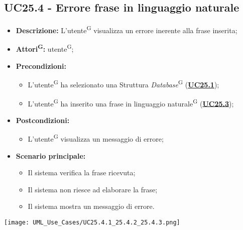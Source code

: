 \subsection{UC25.4 - Errore frase in linguaggio naturale}
\label{sec:UC25.4}
\begin{itemize}
	\item \textbf{Descrizione:} L’utente\textsuperscript{G} visualizza un errore inerente alla frase inserita;
	\item \textbf{Attori\textsuperscript{G}:} utente\textsuperscript{G};
	\item \textbf{Precondizioni:} 
	\begin{itemize}
		\item L’utente\textsuperscript{G} ha selezionato una Struttura \textit{Database}\textsuperscript{G} (\hyperref[sec:UC25.1]{\textbf{UC25.1}});
		\item L'utente\textsuperscript{G} ha inserito una frase in linguaggio naturale\textsuperscript{G} (\hyperref[sec:UC25.3]{\textbf{UC25.3}});
	\end{itemize}
	\item \textbf{Postcondizioni:} 
	\begin{itemize}
		\item L’utente\textsuperscript{G} visualizza un messaggio di errore;
	\end{itemize}
	\item \textbf{Scenario principale:} 
	\begin{itemize}
		\item Il sistema verifica la frase ricevuta;
		\item Il sistema non riesce ad elaborare la frase;
		\item Il sistema mostra un messaggio di errore.
	\end{itemize}
\end{itemize}

\texttt{[image: UML\_Use\_Cases/UC25.4.1\_25.4.2\_25.4.3.png]}

